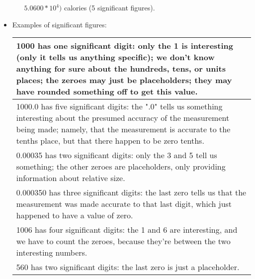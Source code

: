 \begin{itemize}
\begin{enumerate}
$5.0600*10^4)$ calories (5 significant figures).
\end{enumerate}
\item Examples of significant figures:
\begin{table}[h]
\begin{tabular}{|p{16cm}|}
\hline
1000 has   one significant digit: only the 1 is interesting (only it tells us anything   specific); we don't know anything for sure about the hundreds, tens, or units   places; the zeroes may just be placeholders; they may have rounded something   off to get this value.                                     \\ \hline
1000.0 has five significant   digits: the ".0" tells us something interesting about the presumed   accuracy of the measurement being made; namely, that the measurement is   accurate to the tenths place, but that there happen to be zero tenths.                                                                \\ \hline
0.00035 has two significant   digits: only the 3 and 5 tell us something; the other zeroes are   placeholders, only providing information about relative size.                                                                                                                                                     \\ \hline
0.000350 has three significant   digits: the last zero tells us that the measurement was made accurate to that   last digit, which just happened to have a value of zero.                                                                                                                                          \\ \hline
1006 has four significant   digits: the 1 and 6 are interesting, and we have to count the zeroes, because   they're between the two interesting numbers.                                                                                                                                                           \\ \hline
560 has two significant   digits: the last zero is just a placeholder.                                                                                                                                                                                                                                             \\ \hline

\end{tabular}
\end{table}
\end{itemize}
